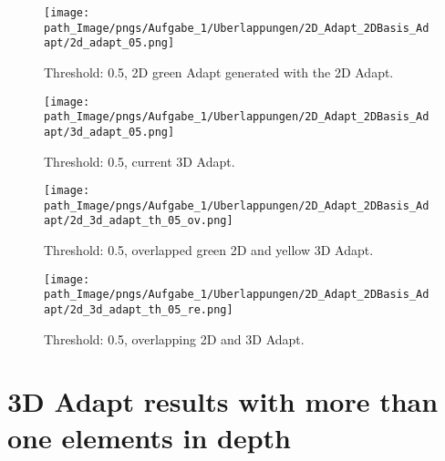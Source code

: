 %
%
%
\begin{figure}[H]
\begin{minipage}{0.45\textwidth}
  \texttt{[image: path\_Image/pngs/Aufgabe\_1/Uberlappungen/2D\_Adapt\_2DBasis\_Adapt/2d\_adapt\_05.png]}
      \vspace*{-10mm}
	\caption{Threshold: 0.5, 2D green Adapt generated with the 2D Adapt.} 
	\label{fig_2dadapt_05}
\end{minipage}
\hfill
\begin{minipage}{0.45\textwidth}
  \texttt{[image: path\_Image/pngs/Aufgabe\_1/Uberlappungen/2D\_Adapt\_2DBasis\_Adapt/3d\_adapt\_05.png]}
	\caption{Threshold: 0.5, current 3D Adapt.}
	\label{fig_3dbadapt_05}
\end{minipage}
\end{figure}
\begin{figure} [!h]
\begin{minipage}{0.45\textwidth}
  \texttt{[image: path\_Image/pngs/Aufgabe\_1/Uberlappungen/2D\_Adapt\_2DBasis\_Adapt/2d\_3d\_adapt\_th\_05\_ov.png]}
      \vspace*{-10mm}
	\caption{Threshold: 0.5, overlapped green 2D and yellow 3D Adapt.} 
	\label{fig_3dadapt_overl_05}
\end{minipage}
\hfill
\begin{minipage}{0.45\textwidth}
  \texttt{[image: path\_Image/pngs/Aufgabe\_1/Uberlappungen/2D\_Adapt\_2DBasis\_Adapt/2d\_3d\_adapt\_th\_05\_re.png]}
      \vspace*{-10mm}
	\caption{Threshold: 0.5, overlapping 2D and 3D Adapt.} 
	\label{fig_3dadapt_re_05}
	\end{minipage}
\end{figure}


\section{3D Adapt results with more than one elements in depth}
\label{section_3d_loadcases}

